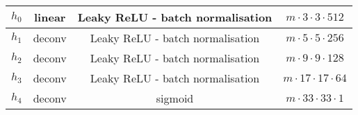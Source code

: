 \begin{table}[!htb]
\begin{tabular}{|c|c|c|c|}
$h_0$                                 & linear                                  & Leaky ReLU - batch normalisation              & $m \cdot 3 \cdot 3 \cdot 512$  \\ \hline
$h_1$                                 & deconv                                  & Leaky ReLU - batch normalisation              & $m \cdot 5 \cdot 5 \cdot 256$  \\ \hline
$h_2$                                 & deconv                                  & Leaky ReLU - batch normalisation              & $m \cdot 9 \cdot 9 \cdot 128$  \\ \hline
$h_3$                                & deconv                                  & Leaky ReLU - batch normalisation              & $m \cdot 17 \cdot 17 \cdot 64$ \\ \hline
$h_4$                                 & deconv                                  & sigmoid                              & $m \cdot 33 \cdot 33 \cdot 1$  \\ \hline
\end{tabular}
\end{table}



